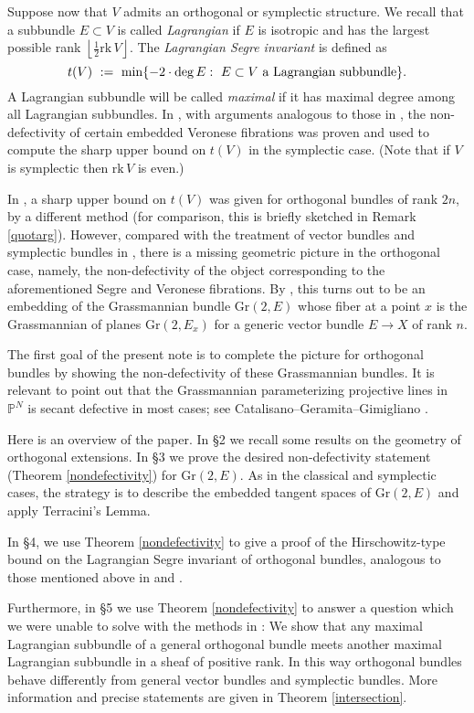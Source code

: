 \documentclass[10pt]{amsart}
\numberwithin{equation}{section}
\newcommand{\pp}{\mathbb P}
\newcommand{\rank}{\mathrm{rk}\,}
\newcommand{\Gr}{\mathrm{Gr}}
\begin{document}
Suppose now that $V$ admits an orthogonal or symplectic structure. We recall that a subbundle $E \subset V$ is called \textsl{Lagrangian} if $E$ is isotropic and has the largest possible rank $\left\lfloor \frac{1}{2} \rank V \right \rfloor$. The \textsl{Lagrangian Segre invariant} is defined as
\[ t(V) \ := \ \min\{ -2 \cdot \deg E : \hbox{ $E \subset V$ a Lagrangian subbundle} \}. \]
A Lagrangian subbundle will be called \textsl{maximal} if it has maximal degree among all Lagrangian subbundles. In \cite[\S 3]{CH2}, with arguments analogous to those in \cite{CH1}, the non-defectivity of certain embedded Veronese fibrations was proven and used to compute the sharp upper bound on $t(V)$ in the symplectic case. (Note that if $V$ is symplectic then $\rank V$ is even.)

In \cite{CH3}, a sharp upper bound on $t(V)$ was given for orthogonal bundles of rank $2n$, by a different method (for comparison, this is briefly sketched in Remark \ref{quotarg}). However, compared with the treatment of vector bundles and symplectic bundles in \cite{CH1, CH2}, there is a missing geometric picture in the orthogonal case, namely, the non-defectivity of the object corresponding to the aforementioned Segre and Veronese fibrations. By \cite[\S 2]{CH3}, this turns out to be an embedding of the Grassmannian bundle $\Gr (2, E)$ whose fiber at a point $x$ is the Grassmannian of planes $\Gr(2, E_x)$ for a generic vector bundle $E \to X$ of rank $n$.

The first goal of the present note is to complete the picture for orthogonal bundles by showing the non-defectivity of these Grassmannian bundles. It is relevant to point out that the Grassmannian parameterizing projective lines in $\pp^N$ is secant defective in most cases; see Catalisano--Geramita--Gimigliano \cite{CGG}.

Here is an overview of the paper. In \S 2 we recall some results on the geometry of orthogonal extensions. In \S 3 we prove the desired non-defectivity statement (Theorem \ref{nondefectivity}) for $\Gr(2, E)$. As in the classical and symplectic cases, the strategy is to describe the embedded tangent spaces of $\Gr(2, E)$ and apply Terracini's Lemma.

In \S 4, we use Theorem \ref{nondefectivity} to give a proof of the Hirschowitz-type bound on the Lagrangian Segre invariant of orthogonal bundles, analogous to those mentioned above in \cite[\S 5]{CH1} and \cite[Theorem 1.4]{CH2}.

Furthermore, in \S 5 we use Theorem \ref{nondefectivity} to answer a question which we were unable to solve with the methods in \cite{CH3}: We show that any maximal Lagrangian subbundle of a general orthogonal bundle meets another maximal Lagrangian subbundle in a sheaf of positive rank. In this way orthogonal bundles behave differently from general vector bundles and symplectic bundles. More information and precise statements are given in Theorem \ref{intersection}.
\end{document}
